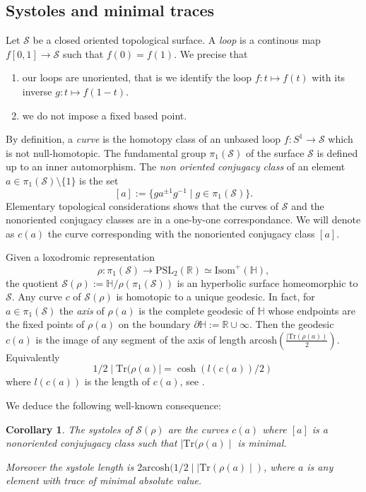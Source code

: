 \documentclass[10pt,a4paper]{amsart}
\newcommand{\HP}{\mathbb{H}}
\newcommand{\R}{\mathbb{R}}
\newcommand{\arcosh}{\mathrm{arcosh}}
\newcommand{\Isom}{\mathrm{Isom}}
\newcommand{\PSL}{{\mathrm {PSL}}}
\newcommand{\Tr}{{\mathrm {Tr}}}
\newtheorem{cor}[lemma]{Corollary}
\newcommand{\cS}{\mathcal{S}}
\begin{document}
\subsection{Systoles and minimal traces}

Let $\cS$ be a closed oriented topological surface.
A {\it loop} is a continous map 
$f[0,1]\to{\cS}$ such that $f(0)=f(1)$.
We precise that
\begin{enumerate}
\item[(a)] our loops are unoriented, that is
we identify the loop
$f:t\mapsto f(t)$ with its inverse
$g: t\mapsto f(1-t)$. 
\item[(b)] we do not impose a fixed based point.
\end{enumerate}

By definition, a {\it curve} is the homotopy class
of an unbased loop $f:S^1\to {\cS}$ which is not null-homotopic.
The fundamental group $\pi_1(\cS)$  of the surface 
$\cS$ is defined up to an inner automorphism. The {\it non oriented conjugacy class}
of an element $a\in \pi_1(\cS)\setminus\{1\}$ is the set
$$[a]:=\{ga^{\pm 1}g^{-1}\mid g\in \pi_1(\cS)\}.$$
Elementary topological considerations shows
that the curves of $\cS$ and the nonoriented conjugacy classes are in a one-by-one correspondance. We will
denote as $c(a)$ the curve corresponding with the nonoriented conjugacy class $[a]$.

Given a loxodromic representation
$$\rho:\pi_1(\cS)\to\PSL_2(\R)\simeq \Isom^+(\HP),$$
the quotient $\cS(\rho):= \HP/\rho(\pi_1(\cS))$ is an hyperbolic surface homeomorphic to
$\cS$. Any curve $c$ of $\cS(\rho)$
is homotopic to a unique geodesic. 
In fact, for  $a\in \pi_1(\cS)$ the {\it axis}  of $\rho(a)$ is the complete geodesic of $\HP$  whose  endpoints are the fixed points of  
$\rho(a)$ on the boundary $\partial \HP:=\R\cup{\infty}$.
Then the geodesic $c(a)$ 
is the image  of any segment of the axis of length
$\arcosh(\frac{\mid\Tr(\rho(a))}{2})$.  Equivalently
$$1/2\mid \Tr(\rho(a)\mid=\cosh(l(c(a))/2)\,$$
where $l(c(a))$ is the length of  $c(a)$, see
\cite{Buser}.
 
\noindent We deduce the 
following well-known consequence:


\begin{cor}\label{mintrace} The systoles of $\cS(\rho)$ are the curves $c(a)$ where $[a]$ is a nonoriented conjujugacy class such that $\mid \Tr(\rho(a)\mid$ is minimal.

Moreover the systole length is 
$2\arcosh(1/2\mid \mid\Tr(\rho(a)\mid)$, where $a$ is any element with  trace of minimal absolute value.
\end{cor}
\end{document}
